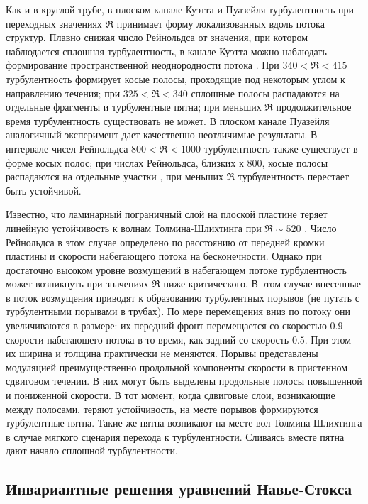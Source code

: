 Как и в круглой трубе, в плоском канале Куэтта \cite{Prigent2002, Barkley2005} и Пуазейля турбулентность при переходных значениях $\Re$ принимает форму локализованных вдоль потока структур. Плавно снижая число Рейнольдса от значения, при котором наблюдается сплошная турбулентность, в канале Куэтта можно наблюдать формирование пространственной неоднородности потока \cite{Duguet2010Couette}. При $340 < \Re < 415$ турбулентность формирует косые полосы, проходящие под некоторым углом к направлению течения; при $325 < \Re < 340$ сплошные полосы распадаются на отдельные фрагменты и турбулентные пятна; при меньших $\Re$ продолжительное время турбулентность существовать не может. В плоском канале Пуазейля аналогичный эксперимент дает качественно неотличимые результаты. В интервале чисел Рейнольдса $800 < \Re < 1000$ турбулентность также существует в форме косых полос; при числах Рейнольдса, близких к 800, косые полосы распадаются на отдельные участки \cite{Tuckerman2014, Lernoult2014, Sano2015}, при меньших $\Re$ турбулентность перестает быть устойчивой. 

Известно, что ламинарный пограничный слой на плоской пластине теряет линейную устойчивость к волнам Толмина-Шлихтинга при $\Re \sim 520$ \cite{Schlichting2004}. Число Рейнольдса в этом случае определено по расстоянию от передней кромки пластины и скорости набегающего потока на бесконечности. Однако при достаточно высоком уровне возмущений в набегающем потоке турбулентность может возникнуть при значениях $\Re$ ниже критического. В этом случае внесенные в поток возмущения приводят к образованию турбулентных порывов \cite{Katasonov2014} (не путать с турбулентными порывами в трубах). По мере перемещения вниз по потоку они увеличиваются в размере: их передний фронт перемещается со скоростью $0.9$ скорости набегающего потока в то время, как задний со скорость $0.5$. При этом их ширина и толщина практически не меняются. Порывы представлены модуляцией преимущественно продольной компоненты скорости в пристенном сдвиговом течении. В них могут быть выделены продольные полосы повышенной и пониженной скорости. В тот момент, когда сдвиговые слои, возникающие между полосами, теряют устойчивость, на месте порывов формируются турбулентные пятна. Такие же пятна возникают на месте вол Толмина-Шлихтинга в случае мягкого сценария перехода к турбулентности. Сливаясь вместе пятна дают начало сплошной турбулентности. 


	\subsection{Инвариантные решения уравнений Навье-Стокса}



